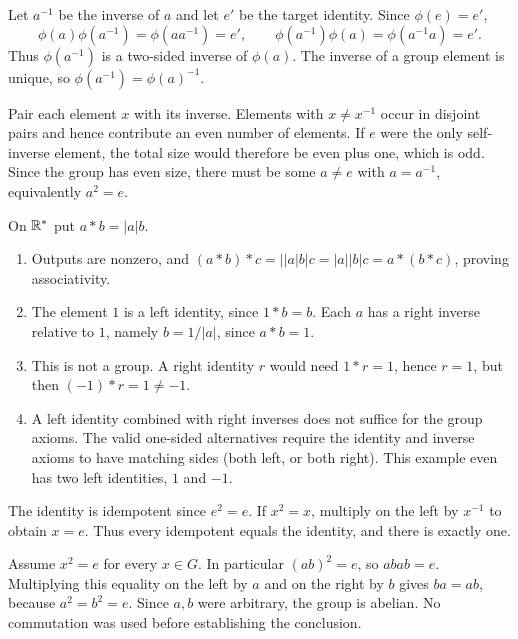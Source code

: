 
Let $a^{-1}$ be the inverse of $a$ and let $e'$ be the target identity. Since $\phi(e)=e'$,
\[\phi(a)\phi(a^{-1})=\phi(aa^{-1})=e',\qquad \phi(a^{-1})\phi(a)=\phi(a^{-1}a)=e'.
\]
Thus $\phi(a^{-1})$ is a two-sided inverse of $\phi(a)$. The inverse of a group element is unique, so $\phi(a^{-1})=\phi(a)^{-1}$.


Pair each element $x$ with its inverse. Elements with $x\ne x^{-1}$ occur in disjoint pairs and hence contribute an even number of elements. If $e$ were the only self-inverse element, the total size would therefore be even plus one, which is odd. Since the group has even size, there must be some $a\ne e$ with $a=a^{-1}$, equivalently $a^2=e$.


On $\mathbb{R}^*$ put $a*b=|a|b$.
\begin{enumerate}[label=(\alph*)]
\item Outputs are nonzero, and $(a*b)*c=\big||a|b\big|c=|a||b|c=a*(b*c)$, proving associativity.
\item The element $1$ is a left identity, since $1*b=b$. Each $a$ has a right inverse relative to $1$, namely $b=1/|a|$, since $a*b=1$.
\item This is not a group. A right identity $r$ would need $1*r=1$, hence $r=1$, but then $(-1)*r=1\ne-1$.
\item A left identity combined with right inverses does not suffice for the group axioms. The valid one-sided alternatives require the identity and inverse axioms to have matching sides (both left, or both right). This example even has two left identities, $1$ and $-1$.
\end{enumerate}


The identity is idempotent since $e^2=e$. If $x^2=x$, multiply on the left by $x^{-1}$ to obtain $x=e$. Thus every idempotent equals the identity, and there is exactly one.


Assume $x^2=e$ for every $x\in G$. In particular $(ab)^2=e$, so $abab=e$. Multiplying this equality on the left by $a$ and on the right by $b$ gives $ba=ab$, because $a^2=b^2=e$. Since $a,b$ were arbitrary, the group is abelian. No commutation was used before establishing the conclusion.

